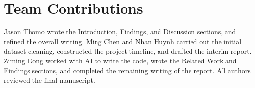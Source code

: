\documentclass[sigconf,nonacm]{acmart}
\begin{document}
\section{Team Contributions}

Jason Thomo wrote the Introduction, Findings, and Discussion sections, and refined the overall writing. Ming Chen and Nhan Huynh carried out the initial dataset cleaning, constructed the project timeline, and drafted the interim report. Ziming Dong worked with AI to write the code, wrote the Related Work and Findings sections, and completed the remaining writing of the report. All authors reviewed the final manuscript.
\end{document}
